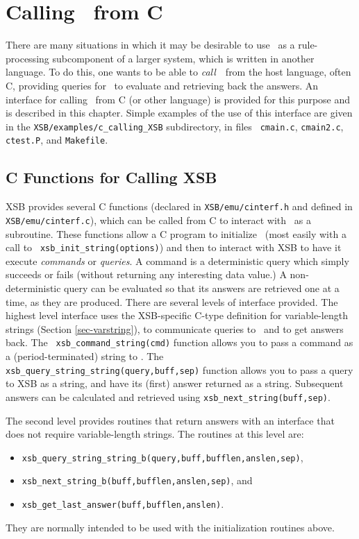 \chapter{Calling \ourprolog\ from C}
\label{ccallingxsb}

There are many situations in which it may be desirable to use
\ourprolog\ as a rule-processing subcomponent of a larger system,
which is written in another language.  To do this, one wants to be
able to {\em call}\ \ourprolog\ from the host language, often C,
providing queries for \ourprolog\ to evaluate and retrieving back the
answers.  An interface for calling \ourprolog\ from C (or other
language) is provided for this purpose and is described in this
chapter.  Simple examples of the use of this interface are given in
the {\tt XSB/examples/c\_calling\_XSB} subdirectory, in files {\tt
cmain.c}, {\tt cmain2.c}, {\tt ctest.P}, and {\tt Makefile}.

\section{C Functions for Calling XSB}

XSB provides several C functions (declared in {\tt XSB/emu/cinterf.h}
and defined in \\ {\tt XSB/emu/cinterf.c}), which can be called from C
to interact with \ourprolog\ as a subroutine. These functions allow a
C program to initialize \ourprolog\ (most easily with a call to {\tt
xsb\_init\_string(options)}) and then to interact with XSB to have it
execute {\em commands} or {\em queries}. A command is a deterministic
query which simply succeeds or fails (without returning any
interesting data value.)  A non-deterministic query can be evaluated
so that its answers are retrieved one at a time, as they are
produced. There are several levels of interface provided.  The highest
level interface uses the XSB-specific C-type definition for
variable-length strings (Section \ref{sec-varstring}), to communicate
queries to \ourprolog\ and to get answers back.  The {\tt
xsb\_command\_string(cmd)} function allows you to pass a command as a
(period-terminated) string to \ourprolog .  The {\tt
xsb\_query\_string\_string(query,buff,sep)} function allows you to
pass a query to XSB as a string, and have its (first) answer returned
as a string.  Subsequent answers can be calculated and retrieved using
{\tt xsb\_next\_string(buff,sep)}.

The second level provides routines that return answers with an
interface that does not require variable-length strings.  The routines
at this level are: 
\begin{itemize}
\item {\tt xsb\_query\_string\_string\_b(query,buff,bufflen,anslen,sep)}, 
\item {\tt xsb\_next\_string\_b(buff,bufflen,anslen,sep)}, and
\item  {\tt xsb\_get\_last\_answer(buff,bufflen,anslen)}.  
\end{itemize}
They are normally intended to be used with the initialization routines
above.

